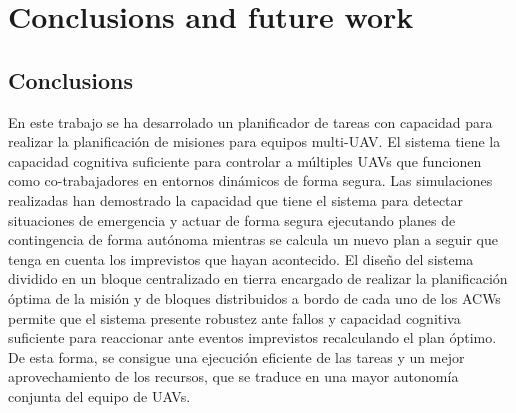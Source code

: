 \documentclass[fontsize=11pt, English=true, Myfinal=true, twoside, numbers=noenddot]{scrbook}
\begin{document}
\mainmatter

\pagestyle{esitscCD}

%

%

% 
%
%

%

%

%
% 
\chapter{Conclusions and future work}
\label{ch:ConclusionsAndFutureWork}
\section{Conclusions}
\label{sec:Conclusions}
En este trabajo se ha desarrolado un planificador de tareas con capacidad para realizar la planificación de misiones para equipos multi-UAV. El sistema tiene la capacidad cognitiva suficiente para controlar a múltiples UAVs que funcionen como co-trabajadores en entornos dinámicos de forma segura. Las simulaciones realizadas han demostrado la capacidad que tiene el sistema para detectar situaciones de emergencia y actuar de forma segura ejecutando planes de contingencia de forma autónoma mientras se calcula un nuevo plan a seguir que tenga en cuenta los imprevistos que hayan acontecido. El diseño del sistema dividido en un bloque centralizado en tierra encargado de realizar la planificación óptima de la misión y de bloques distribuidos a bordo de cada uno de los ACWs permite que el sistema presente robustez ante fallos y capacidad cognitiva suficiente para reaccionar ante eventos imprevistos recalculando el plan óptimo. De esta forma, se consigue una ejecución eficiente de las tareas y un mejor aprovechamiento de los recursos, que se traduce en una mayor autonomía conjunta del equipo de UAVs.
\end{document}
